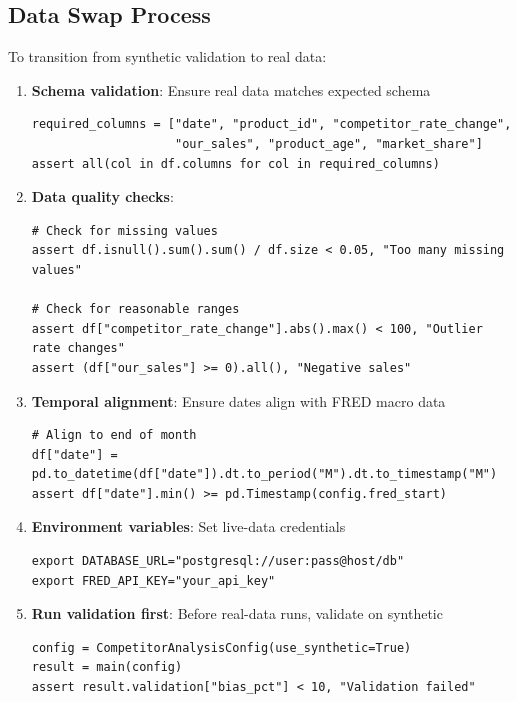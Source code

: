 \subsection{Data Swap Process}

To transition from synthetic validation to real data:

\begin{enumerate}
    \item \textbf{Schema validation}: Ensure real data matches expected schema
    \begin{verbatim}
required_columns = ["date", "product_id", "competitor_rate_change",
                    "our_sales", "product_age", "market_share"]
assert all(col in df.columns for col in required_columns)
    \end{verbatim}

    \item \textbf{Data quality checks}:
    \begin{verbatim}
# Check for missing values
assert df.isnull().sum().sum() / df.size < 0.05, "Too many missing values"

# Check for reasonable ranges
assert df["competitor_rate_change"].abs().max() < 100, "Outlier rate changes"
assert (df["our_sales"] >= 0).all(), "Negative sales"
    \end{verbatim}

    \item \textbf{Temporal alignment}: Ensure dates align with FRED macro data
    \begin{verbatim}
# Align to end of month
df["date"] = pd.to_datetime(df["date"]).dt.to_period("M").dt.to_timestamp("M")
assert df["date"].min() >= pd.Timestamp(config.fred_start)
    \end{verbatim}

    \item \textbf{Environment variables}: Set live-data credentials
    \begin{verbatim}
export DATABASE_URL="postgresql://user:pass@host/db"
export FRED_API_KEY="your_api_key"
    \end{verbatim}

    \item \textbf{Run validation first}: Before real-data runs, validate on synthetic
    \begin{verbatim}
config = CompetitorAnalysisConfig(use_synthetic=True)
result = main(config)
assert result.validation["bias_pct"] < 10, "Validation failed"
    \end{verbatim}
\end{enumerate}

